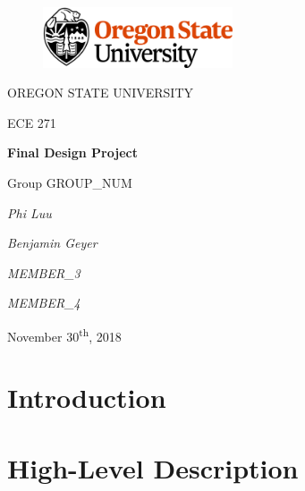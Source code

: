 \documentclass[12pt]{article}
\begin{document}
\begin{titlepage}
  \begin{center} \LARGE
    \begin{figure}[ht]
      \centering
      \includegraphics[width=0.5\textwidth]{osu_logo.png}
    \end{figure}

    \vspace{0.25in}

    OREGON STATE UNIVERSITY

    \vspace{0.25in}

    ECE 271

    \vfill

    \textbf{Final Design Project}

    Group GROUP\_NUM

    \vspace{0.5in}

    \textit{Phi Luu}

    \textit{Benjamin Geyer}

    \textit{MEMBER\_3}

    \textit{MEMBER\_4}

    \vfill

    November 30\textsuperscript{th}, 2018
  \end{center}
\end{titlepage}

\tableofcontents \newpage

\section{Introduction}

\section{High-Level Description}
\end{document}
